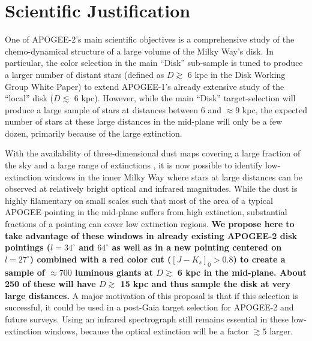 \documentclass[12pt,preprint]{aastex}
\newcommand{\eg}{e.g.}
\begin{document}
\newpage
\section{Scientific Justification}

One of APOGEE-2's main scientific objectives is a comprehensive study
of the chemo-dynamical structure of a large volume of the Milky Way's
disk. In particular, the color selection in the main ``Disk''
sub-sample is tuned to produce a larger number of distant stars
(defined as $D\gtrsim$ 6 kpc in the Disk Working Group White Paper) to
extend APOGEE-1's already extensive study of the ``local'' disk ($D
\lesssim$ 6 kpc). However, while the main ``Disk'' target-selection
will produce a large sample of stars at distances between 6 and
$\approx9$ kpc, the expected number of stars at these large distances
in the mid-plane will only be a few dozen, primarily because of the
large extinction.

With the availability of three-dimensional dust maps covering a large
fraction of the sky and a large range of extinctions
\citep[\eg,][]{Marshall06a,Green15a}, it is now possible to identify
low-extinction windows in the inner Milky Way where stars at large
distances can be observed at relatively bright optical and infrared
magnitudes. While the dust is highly filamentary on small scales such
that most of the area of a typical APOGEE pointing in the mid-plane
suffers from high extinction, substantial fractions of a pointing can
cover low extinction regions. {\bf We propose here to take advantage
  of these windows in already existing APOGEE-2 disk pointings
  ($l=34^\circ$ and $64^\circ$ as well as in a new pointing centered
  on $l=27^\circ$) combined with a red color cut ($[J-K_s]_0 > 0.8$)
  to create a sample of $\approx 700$ luminous giants at $D\gtrsim$ 6
  kpc in the mid-plane. About 250 of these will have $D \gtrsim$ 15
  kpc and thus sample the disk at very large distances.} A major
motivation of this proposal is that if this selection is successful,
it could be used in a post-Gaia target selection for APOGEE-2 and
future surveys. Using an infrared spectrograph still remains essential
in these low-extinction windows, because the optical extinction will
be a factor $\gtrsim5$ larger.
\end{document}
